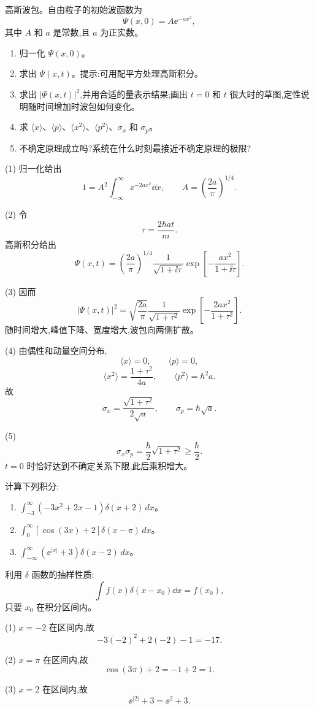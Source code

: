 \begin{question}
高斯波包。自由粒子的初始波函数为
\[
\Psi(x,0)=A\ee^{-ax^2},
\]
其中 $A$ 和 $a$ 是常数,且 $a$ 为正实数。
\begin{enumerate}
\item 归一化 $\Psi(x,0)$。
\item 求出 $\Psi(x,t)$。提示:可用配平方处理高斯积分。
\item 求出 $|\Psi(x,t)|^2$,并用合适的量表示结果;画出 $t=0$ 和 $t$ 很大时的草图,定性说明随时间增加时波包如何变化。
\item 求 $\langle x\rangle$、$\langle p\rangle$、$\langle x^2\rangle$、$\langle p^2\rangle$、$\sigma_x$ 和 $\sigma_p$。
\item 不确定原理成立吗?系统在什么时刻最接近不确定原理的极限?
\end{enumerate}
\begin{solution}
(1) 归一化给出
\[
1=A^2\int_{-\infty}^{\infty}\ee^{-2ax^2}\dd x,
\qquad
A=\left(\frac{2a}{\pi}\right)^{1/4}.
\]

(2) 令
\[
\tau=\frac{2\hbar at}{m}.
\]
高斯积分给出
\[
\Psi(x,t)=\left(\frac{2a}{\pi}\right)^{1/4}\frac1{\sqrt{1+\ii\tau}}
\exp\left[-\frac{a x^2}{1+\ii\tau}\right].
\]

(3) 因而
\[
|\Psi(x,t)|^2=\sqrt{\frac{2a}{\pi}}\frac1{\sqrt{1+\tau^2}}
\exp\left[-\frac{2ax^2}{1+\tau^2}\right].
\]
随时间增大,峰值下降、宽度增大,波包向两侧扩散。

(4) 由偶性和动量空间分布,
\[
\langle x\rangle=0,
\qquad \langle p\rangle=0,
\]
\[
\langle x^2\rangle=\frac{1+\tau^2}{4a},
\qquad
\langle p^2\rangle=\hbar^2a.
\]
故
\[
\sigma_x=\frac{\sqrt{1+\tau^2}}{2\sqrt a},
\qquad
\sigma_p=\hbar\sqrt a.
\]

(5) 
\[
\sigma_x\sigma_p=\frac\hbar2\sqrt{1+\tau^2}\ge\frac\hbar2.
\]
$t=0$ 时恰好达到不确定关系下限,此后乘积增大。
\end{solution}
\end{question}

\begin{question}
计算下列积分:
\begin{enumerate}
\item $\displaystyle \int_{-3}^{\infty}(-3x^2+2x-1)\delta(x+2)\,dx$。
\item $\displaystyle \int_{0}^{\infty}[\cos(3x)+2]\delta(x-\pi)\,dx$。
\item $\displaystyle \int_{-\infty}^{\infty}(\ee^{|x|}+3)\delta(x-2)\,dx$。
\end{enumerate}
\begin{solution}
利用 $\delta$ 函数的抽样性质:
\[
\int f(x)\delta(x-x_0)\dd x=f(x_0),
\]
只要 $x_0$ 在积分区间内。

(1) $x=-2$ 在区间内,故
\[
-3(-2)^2+2(-2)-1=-17.
\]

(2) $x=\pi$ 在区间内,故
\[
\cos(3\pi)+2=-1+2=1.
\]

(3) $x=2$ 在区间内,故
\[
\ee^{|2|}+3=\ee^2+3.
\]
\end{solution}
\end{question}

